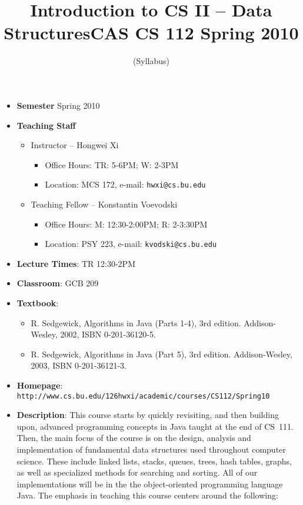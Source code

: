 \documentclass[11pt]{article}
\title{Introduction to CS II -- Data Structures\break CAS CS 112 Spring 2010}
\author{(Syllabus)}
\date{}
\begin{document}
\maketitle
\thispagestyle{empty}

\begin{itemize}
\item {\bf Semester} Spring 2010
\item {\bf Teaching Staff}
\begin{itemize}
\item
Instructor -- Hongwei Xi
\begin{itemize}
\item
Office Hours: TR: 5-6PM; W: 2-3PM
\item
Location: MCS 172, e-mail: \texttt{hwxi@cs.bu.edu}
\end{itemize}

\item
Teaching Fellow -- Konstantin Voevodski
\begin{itemize}
\item
Office Hours: M: 12:30-2:00PM; R: 2-3:30PM
\item
Location: PSY 223, e-mail: \texttt{kvodski@cs.bu.edu}
\end{itemize}
\end{itemize}

\item {\bf Lecture Times}: TR 12:30-2PM
\item {\bf Classroom}: GCB 209
\item {\bf Textbook}:\kern6pt
\begin{itemize}
\item
R. Sedgewick, Algorithms in Java (Parts 1-4), 3rd edition. Addison-Wesley, 2002, ISBN 0-201-36120-5.
\item
R. Sedgewick, Algorithms in Java (Part 5), 3rd edition. Addison-Wesley, 2003, ISBN 0-201-36121-3.
\end{itemize}

\item {\bf Homepage}: {\tt http://www.cs.bu.edu/\char126hwxi/academic/courses/CS112/Spring10}

\item {\bf Description}: This course starts by quickly revisiting, and then
building upon, advanced programming concepts in Java taught at the end of
CS~111. Then, the main focus of the course is on the design, analysis
and implementation of fundamental data structures used throughout computer
science. These include linked lists, stacks, queues, trees, hash tables,
graphs, as well as specialized methods for searching and sorting. All of
our implementations will be in the the object-oriented programming language
Java. The emphasis in teaching this course centers around the following:


\end{itemize}
\end{document}
